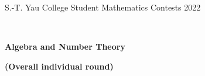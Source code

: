 \documentclass[a4paper,12pt,leqno]{article}
\theoremstyle{definition}
\newtheorem{prob}{Problem}
\newcommand{\FF}{\mathbb{F}}
\newcommand{\ZZ}{\mathbb{Z}}
\begin{document}
\begin{center}
\begin{center}
 { \large  S.-T. Yau College Student Mathematics Contests 2022}
 
 \

  { \bf \Large Algebra and Number Theory   } 
 \medskip 
  
  {\bf \large (Overall individual round) }
\end{center}
\end{center}

\bigskip

%
%
%
\end{document}
